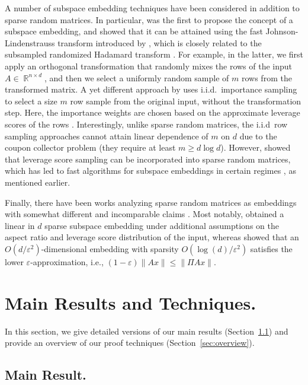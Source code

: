 \documentclass[11pt]{amsart}
\numberwithin{equation}{section}
\numberwithin{equation}{section}
\DeclareMathOperator{\R}{\mathbb{R}}
\begin{document}
A number of subspace embedding techniques have been considered in addition to sparse random matrices. In particular, \cite{sarlos2006improved} was the first to propose the concept of a subspace embedding, and showed that it can be attained using the fast Johnson-Lindenstrauss transform introduced by \cite{ailon2009fast}, which is closely related to the subsampled randomized Hadamard transform \cite{tropp2011improved}. For example, in the latter, we first apply an orthogonal transformation that randomly mixes the rows of the input $A\in\R^{n\times d}$, and then we select a uniformly random sample of $m$ rows from the transformed matrix. A yet different approach by \cite{drineas2006sampling} uses i.i.d.\ importance sampling to select a size $m$ row sample from the original input, without the transformation step. Here, the importance weights are chosen based on the approximate leverage scores of the rows \cite{drineas2012fast,li2013iterative}. Interestingly, unlike sparse random matrices, the i.i.d\ row sampling approaches cannot attain linear dependence of $m$ on $d$ due to the coupon collector problem (they require at least $m\geq d\log d$). However, \cite{less-embeddings} showed that leverage score sampling can be incorporated into sparse random matrices, which has led to fast algorithms for subspace embeddings in certain regimes \cite{chenakkod2025optimal}, as mentioned earlier.

Finally, there have been works analyzing sparse random matrices as embeddings with somewhat different and incomparable claims \cite{cartis2021hashing,tropp2025comparison,less-embeddings,gaussianization}. Most notably, \cite{cartis2021hashing} obtained a linear in $d$ sparse subspace embedding under additional assumptions on the aspect ratio and leverage score distribution of the input, whereas \cite{tropp2025comparison} showed that an $O(d/\varepsilon^2)$-dimensional embedding with sparsity $O(\log(d)/\varepsilon^2)$ satisfies the lower $\varepsilon$-approximation, i.e., $(1-\varepsilon)\|Ax\|\leq\|\Pi Ax\|$.


\section{Main Results and Techniques.}

In this section, we give detailed versions of our main results (Section~\ref{s:main-result}) and provide an overview of our proof techniques (Section~\ref{sec:overview}).


\subsection{Main Result.}
\label{s:main-result}
\end{document}
